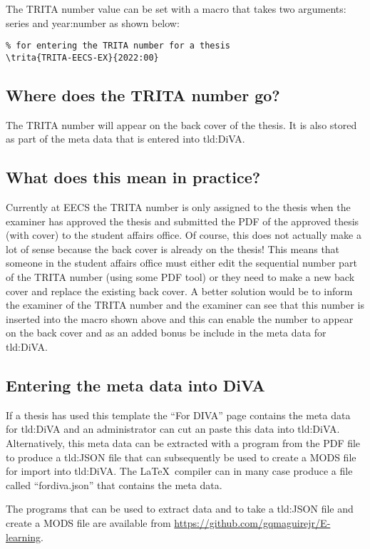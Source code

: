 The TRITA number value can be set with a macro that takes two arguments: series and year:number as shown below:
\begin{lstlisting}
% for entering the TRITA number for a thesis
\trita{TRITA-EECS-EX}{2022:00}  
\end{lstlisting}

\subsection{Where does the TRITA number go?}
The TRITA number will appear on the back cover of the thesis. It is also stored as part of the meta data that is entered into \gls{tld:DiVA}.

\subsection{What does this mean in practice?}
Currently at EECS the TRITA number is only assigned to the thesis when the examiner has approved the thesis and submitted the PDF of the approved thesis (with cover) to the student affairs office. Of course, this does not actually make a lot of sense because the back cover is already on the thesis! This means that someone in the student affairs office must either \first edit the sequential number part of the TRITA number (using some PDF tool) or \second they need to make a new back cover and replace the existing back cover. A better solution would be to inform the examiner of the TRITA number and the examiner can see that this number is inserted into the macro shown above and this can enable the number to appear on the back cover and as an added bonus be include in the meta data for \gls{tld:DiVA}.

\subsection{Entering the meta data into DiVA}
If a thesis has used this template the ``For DIVA'' page contains the meta data for \gls{tld:DiVA} and an administrator can cut an paste this data into \gls{tld:DiVA}. Alternatively, this meta data can be extracted with a program from the PDF file to produce a \gls{tld:JSON} file that can subsequently be used to create a MODS file for import into \gls{tld:DiVA}. The \LaTeX\ compiler can in many case produce a file called ``fordiva.json'' that contains the meta data.

The programs that can be used to extract data and to take a \gls{tld:JSON} file and create a MODS file are available from \url{https://github.com/gqmaguirejr/E-learning}.

